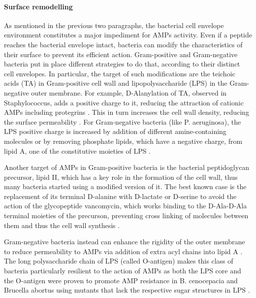 \paragraph{Surface remodelling}
As mentioned in the previous two paragraphs, the bacterial cell envelope environment constitutes a major impediment for AMPs activity.
%
Even if a peptide reaches the bacterial envelope intact, bacteria can modify the characteristics of their surface to prevent its efficient action.
%
Gram-positive and Gram-negative bacteria put in place different strategies to do that, according to their distinct cell envelopes. In particular, the target of such modifications are the teichoic acids (TA) in Gram-positive cell wall and lipopolysaccharide (LPS) in the Gram-negative outer membrane.
%
For example, D-Alanylation of TA, observed in Staphylococcus, adds a positive charge to it, reducing the attraction of cationic AMPs including protegrins \cite{Peschel1999,Fabretti2006,Saar-Dover2012}.
%
This in turn increases the cell wall density, reducing the surface permeability \cite{Saar-Dover2012}.
%
For Gram-negative bacteria (like P. aeruginosa), the LPS positive charge is increased by addition of different amine-containing molecules \cite{Moskowitz2004,Gunn1998} or by removing phosphate lipids, which have a negative charge, from lipid A, one of the constitutive moieties of LPS \cite{Wang2004MsbA,Wang2006}.

Another target of AMPs in Gram-positive bacteria is the bacterial peptidoglycan precursor, lipid II, which has a key role in the formation of the cell wall, thus many bacteria started using a modified version of it.
The best known case is the replacement of its terminal D-alanine with D-lactate or D-serine \cite{Bugg1991} to avoid the action of the glycopeptide vancomycin, which works binding to the D-Ala-D-Ala terminal moieties of the precurson, preventing cross linking of molecules between them and thus the cell wall synthesis \cite{Brotz1998}.

Gram-negative bacteria instead can enhance the rigidity of the outer membrane to reduce permeability to AMPs via addition of extra acyl chains into lipid A \cite{Guo1998,Bishop2000}. The long polysaccharide chain of LPS (called O-antigen) makes this class of bacteria particularly resilient to the action of AMPs \cite{Silhavy2010} as both the LPS core and the O-antigen were proven to promote AMP resistance in B. cenocepacia and Brucella abortus using mutants that lack the respective sugar structures in LPS \cite{Loutet2006,Allen1998}.

